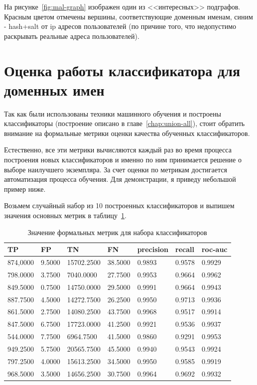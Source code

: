 \documentclass[a4paper,14pt]{extreport} %
\begin{document}
На рисунке~\ref{fig:mal-graph} изображен один из <<интересных>> подграфов. Красным цветом отмечены вершины, соответствующие доменным именам, синим - hash+salt от ip адресов пользователей (по причине того, что недопустимо раскрывать реальные адреса пользователей). 

\section{Оценка работы классификатора для доменных имен}
Так как были использованы техники машинного обучения и построены классификаторы (построение описано в главе~\ref{chap:union-all}), стоит обратить внимание на формальные метрики оценки качества обученных классификаторов.

Естественно, все эти метрики вычисляются каждый раз во время процесса построения новых классификаторов и именно по ним принимается решение о выборе наилучшего экземпляра. За счет оценки по метрикам достигается автоматизация процесса обучения. Для демонстрации, я приведу небольшой пример ниже.

Возьмем случайный набор из 10 построенных классификаторов и выпишем значения основных метрик в таблицу~\ref{tab:metr}.

\begin{table}[H]
	\centering
	\caption{Значение формальных метрик для набора классификаторов}
	\label{tab:metr}
	\begin{tabular}{ |l|l|l|l|l|l|l|}
		\hline
		TP       & FP     & TN         & FN      & precision & recall & roc-auc \\ \hline
		874,0000 & 9.5000 & 15702.2500 & 38.5000 & 0.9893    & 0.9578 & 0.9929  \\ \hline
		798.0000 & 3.7500 & 7040.0000  & 27.7500 & 0.9953    & 0.9664 & 0.9962  \\ \hline
		849.5000 & 0.7500 & 14750.0000 & 29.5000 & 0.9991    & 0.9664 & 0.9943  \\ \hline
		887.7500 & 4.5000 & 14272.7500 & 26.2500 & 0.9950    & 0.9713 & 0.9936  \\ \hline
		861.5000 & 2.7500 & 14080.2500 & 43.7500 & 0.9968    & 0.9517 & 0.9914  \\ \hline
		847.5000 & 6.7500 & 17723.0000 & 41.2500 & 0.9921    & 0.9536 & 0.9937  \\ \hline
		544.0000 & 7.7500 & 6964.7500  & 41.5000 & 0.9860    & 0.9291 & 0.9953  \\ \hline
		949.2500 & 5.7500 & 20565.7500 & 45.5000 & 0.9940    & 0.9543 & 0.9924  \\ \hline
		797.2500 & 4.0000 & 15613.2500 & 34.5000 & 0.9950    & 0.9585 & 0.9919  \\ \hline
		968.5000 & 3.5000 & 14656.2500 & 30.7500 & 0.9964    & 0.9692 & 0.9932  \\ \hline
	\end{tabular}
\end{table}
\end{document}
